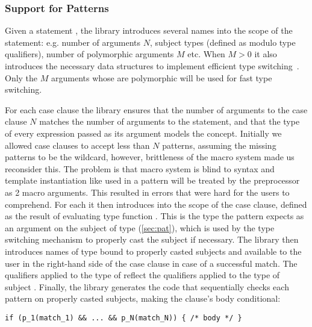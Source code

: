 \subsubsection{Support for Patterns}
\label{sec:patcases}

Given a statement , the library introduces several 
names into the scope of the statement: e.g. number of arguments $N$, subject 
types  (defined as  modulo type 
qualifiers), number of polymorphic arguments $M$ etc. When $M > 0$ it also 
introduces the necessary data structures to implement efficient type 
switching~\cite{TS12}. Only the $M$ arguments whose  are 
polymorphic will be used for fast type switching.

For each case clause  the library ensures that the 
number of arguments to the case clause $N$ matches the number of arguments to 
the  statement, and that the type  of every expression 
 passed as its argument models the  concept. 
Initially we allowed case clauses to accept less than $N$ patterns, assuming the 
missing patterns to be the wildcard, however, brittleness of the macro system 
made us reconsider this. The problem is that macro system is blind to \Cpp{} 
syntax and template instantiation like  used in a pattern will be 
treated by the preprocessor as 2 macro arguments. This resulted in errors that 
were hard for the users to comprehend.
For each  it then introduces  into the 
scope of the case clause, defined as the result of evaluating type function 
. This is the type the pattern 
expects as an argument on the subject of type  (\textsection\ref{sec:pat}), 
which is used by the type switching mechanism to properly cast the subject if necessary. 
The library then introduces names  of type  
bound to properly casted subjects and available to the user in the right-hand 
side of the case clause in case of a successful match. The qualifiers applied to 
the type of  reflect the qualifiers applied to the type of subject 
. Finally, the library generates the code that sequentially checks 
each pattern on properly casted subjects, making the clause's body conditional:

\begin{lstlisting}
if (p_1(match_1) && ... && p_N(match_N)) { /* body */ }
\end{lstlisting}

